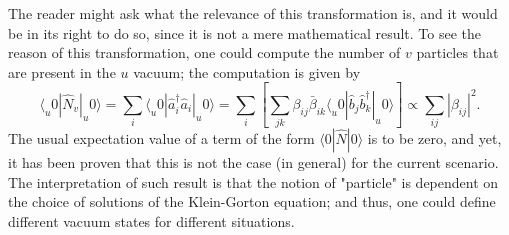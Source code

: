 The reader might ask what the relevance of this transformation is, and it would be in its right to do so, since it is not a mere mathematical result. To see the reason of this transformation, one could compute the number of $v$ particles that are present in the $u$ vacuum; the computation is given by
\begin{equation}\label{eq: Bogoliubov Number particles general}
	\langle_u0|\hat{N}_v|_u0\rangle=\sum_i\langle_u0|\hat{a}_i^\dagger\hat{a}_i|_u0\rangle=\sum_{i}\left[\sum_{jk}\beta_{ij}\bar \beta_{ik}\langle_u0|\hat{b}_j\hat{b}_k^\dagger|_u0\rangle\right]\propto \sum_{ij}|\beta_{ij}|^2.
\end{equation}
The usual expectation value of a term of the form $\langle0|\hat{N}|0\rangle$ is to be zero, and yet, it has been proven that this is not the case (in general) for the current scenario. The interpretation of such result is that the notion of "particle" is dependent on the choice of solutions of the Klein-Gorton equation; and thus, one could define different vacuum states for different situations.

